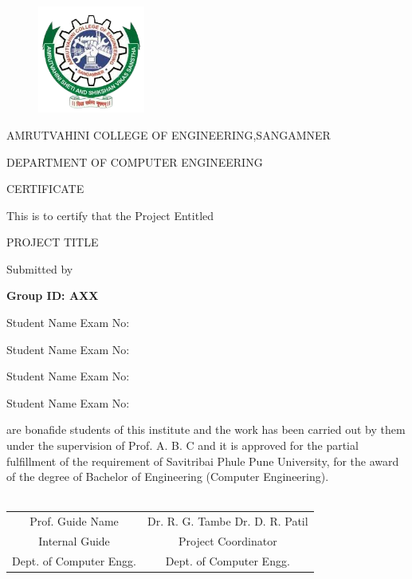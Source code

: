 \documentclass[oneside,a4paper,12pt]{report}
\begin{document}
\newpage

\begin{figure}[ht]
\centering
\includegraphics[width=100pt]{AVCOE_LOGO.png}
\end{figure}


{\bfseries \fontsize{14}{12} \selectfont \centerline{AMRUTVAHINI COLLEGE OF ENGINEERING,SANGAMNER}
\centerline{DEPARTMENT OF COMPUTER ENGINEERING}
\vspace*{1\baselineskip}} 


{\bfseries \fontsize{16}{12} \selectfont \centerline{CERTIFICATE} 
\vspace*{1\baselineskip}} 

\centerline{This is to certify that the Project Entitled}
\vspace*{1\baselineskip} 


{\bfseries \fontsize{14}{12} \selectfont \centerline{PROJECT TITLE}
\vspace*{1\baselineskip}}

\centerline{Submitted by}
\vspace*{1\baselineskip}
\centerline{\bf{Group ID: AXX}}  
\centerline{Student Name  \hspace{25 mm} Exam No: } 
\centerline{Student Name \hspace{25 mm} Exam No:  } 
\centerline{Student Name \hspace{25 mm} Exam No: }
\centerline{Student Name \hspace{25 mm} Exam No: }
\vspace*{1\baselineskip} 
are bonafide students of this institute and the work has been carried out by them under the supervision of  Prof. A. B. C and it is approved for the partial fulfillment of the requirement of Savitribai Phule Pune University, for the award of the degree of Bachelor of Engineering (Computer Engineering). \\\\
\bgroup
\def\arraystretch{0.7}
\begin{tabular}{c c }
Prof. Guide Name &  \hspace{50 mm} Dr. R. G. Tambe Dr. D. R. Patil \\								
Internal Guide   &  \hspace{50 mm} Project Coordinator \\
Dept. of Computer Engg.  &	\hspace{50 mm}Dept. of Computer Engg.  \\
\end{tabular}
 \vspace*{1.5\baselineskip}                     
                                                   
\end{document}
